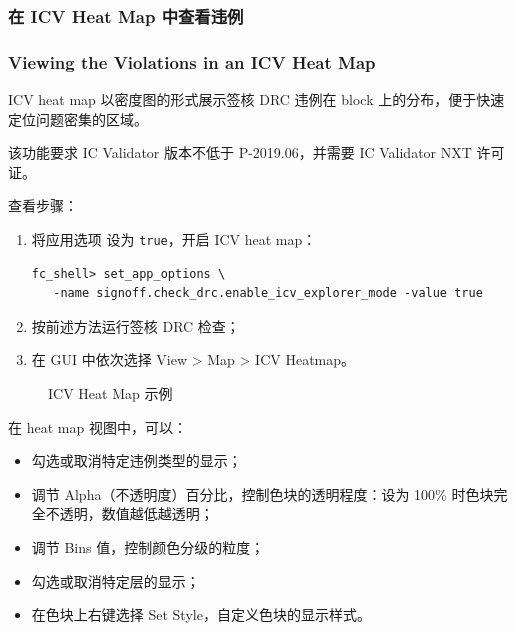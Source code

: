 \subsubsection{在 ICV Heat Map 中查看违例}
\subsubsection*{Viewing the Violations in an ICV Heat Map}

ICV heat map 以密度图的形式展示签核 DRC 违例在 block 上的分布，便于快速定位问题密集的区域。

\begin{noteBox}
该功能要求 IC Validator 版本不低于 P-2019.06，并需要 IC Validator NXT 许可证。
\end{noteBox}

查看步骤：
\begin{enumerate}
  \item 将应用选项  设为 \texttt{true}，开启 ICV heat map：
\begin{lstlisting}
fc_shell> set_app_options \
   -name signoff.check_drc.enable_icv_explorer_mode -value true
\end{lstlisting}
  \item 按前述方法运行签核 DRC 检查；
  \item 在 GUI 中依次选择 View > Map > ICV Heatmap。
\end{enumerate}

\begin{figure}[htbp]
\centering
{}
\caption{ICV Heat Map 示例}
\label{fig:icv-heatmap}
\end{figure}

在 heat map 视图中，可以：
\begin{itemize}
  \item 勾选或取消特定违例类型的显示；
  \item 调节 Alpha（不透明度）百分比，控制色块的透明程度：设为 100\% 时色块完全不透明，数值越低越透明；
  \item 调节 Bins 值，控制颜色分级的粒度；
  \item 勾选或取消特定层的显示；
  \item 在色块上右键选择 Set Style，自定义色块的显示样式。
\end{itemize}

